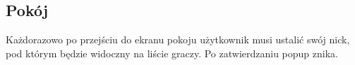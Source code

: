 \documentclass[12pt]{article}
\begin{document}
\newpage
\subsection{Pokój}
Każdorazowo po przejściu do ekranu pokoju użytkownik musi ustalić swój nick, pod którym będzie widoczny na liście graczy.
Po zatwierdzaniu popup znika.
\begin{figure}[!htb]
    \centering
    \centering
\end{figure}
\end{document}
